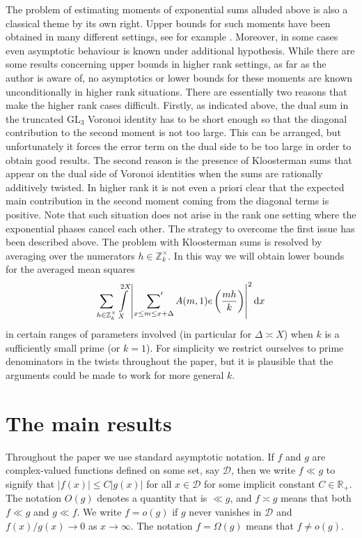 \documentclass[a4paper,10pt,twoside]{amsart}
\theoremstyle{definition}
\numberwithin{equation}{section}
\renewcommand\:{\colon}
\newcommand{\sump}{\mathop{{\sum}^{\raisebox{-3pt}{\makebox[0pt][l]{$'$}}}}}
\begin{document}
The problem of estimating moments of exponential sums alluded above is also a classical theme by its own right. Upper bounds for such moments have been obtained in many different settings, see for example \cite{Ivic2, Wu--Zhai, Jaasaari--Vesalainen1}. Moreover, in some cases even asymptotic behaviour is known \cite{Lester, Jaasaari} under additional hypothesis. While there are some results concerning upper bounds in higher rank settings, as far as the author is aware of, no asymptotics or lower bounds for these moments are known unconditionally in higher rank situations. There are essentially two reasons that make the higher rank cases difficult. Firstly, as indicated above, the dual sum in the truncated $\mathrm{GL}_3$ Voronoi identity has to be short enough so that the diagonal contribution to the second moment is not too large. This can be arranged, but unfortunately it forces the error term on the dual side to be too large in order to obtain good results. The second reason is the presence of Kloosterman sums that appear on the dual side of Voronoi identities when the sums are rationally additively twisted. In higher rank it is not even a priori clear that the expected main contribution in the second moment coming from the diagonal terms is positive. Note that such situation does not arise in the rank one setting where the exponential phases cancel each other. The strategy to overcome the first issue has been described above. The problem with Kloosterman sums is resolved by averaging over the numerators $h\in\mathbb Z_k^\times$. In this way we will obtain lower bounds for the averaged mean squares 
\begin{align*}
\sum_{h\in\mathbb Z_k^\times}\int\limits_X^{2X}\left|\sump_{x\leq m\leq x+\Delta}A(m,1)e\left(\frac{mh}k\right)\right|^2 \mathrm d x
\end{align*}
in certain ranges of parameters involved (in particular for $\Delta\asymp X$) when $k$ is a sufficiently small prime (or $k=1$). For simplicity we restrict ourselves to prime denominators in the twists throughout the paper, but it is plausible that the arguments could be made to work for more general $k$. 

\section{The main results}        

\noindent Throughout the paper we use standard asymptotic notation. If $f$ and $g$ are complex-valued functions defined on some set, say $\mathcal D$, then we write $f\ll g$ to  signify that $|f(x)|\leqslant C|g(x)|$ for all $x\in\mathcal D$ for some implicit constant $C\in\mathbb R_+$. The notation $O(g)$ denotes a quantity that is $\ll g$, and $f\asymp g$ means that both $f\ll g$ and $g\ll f$. We write $f=o(g)$ if $g$ never vanishes in $\mathcal D$ and $f(x)/g(x)\longrightarrow 0$ as $x\longrightarrow\infty$. The notation $f=\Omega(g)$ means that $f\neq o(g)$.
\end{document}

